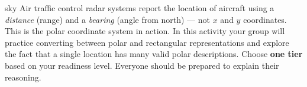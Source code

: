 \documentclass[10pt]{article}
\begin{document}
\namepartnerperiod

\vspace{0.10in}

\begin{scenariobox}{sky}
Air traffic control radar systems report the location of aircraft using a
\emph{distance} (range) and a \emph{bearing} (angle from north) --- not $x$
and $y$ coordinates. This is the polar coordinate system in action. In this
activity your group will practice converting between polar and rectangular
representations and explore the fact that a single location has many valid
polar descriptions. Choose \textbf{one tier} based on your readiness level.
Everyone should be prepared to explain their reasoning.
\end{scenariobox}

\vspace{0.08in}
\end{document}
